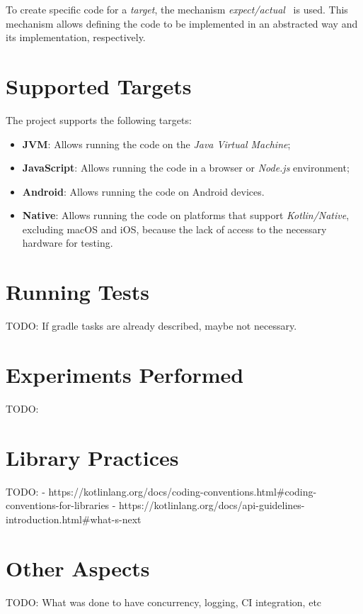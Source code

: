 To create specific code for a \textit{target}, the mechanism \textit{expect/actual}~\cite{kmp-expect-actual} is used.
This mechanism allows defining the code to be implemented in an abstracted way and its implementation, respectively.


\section{Supported Targets}\label{sec:supported-targets}

The project supports the following targets:

\begin{itemize}
    \item \textbf{JVM}: Allows running the code on the \textit{Java Virtual Machine};
    \item \textbf{JavaScript}: Allows running the code in a browser or \textit{Node.js} environment;
    \item \textbf{Android}: Allows running the code on Android devices.
    \item \textbf{Native}: Allows running the code on platforms that support \textit{Kotlin/Native}, excluding macOS and iOS, because the lack of access to the necessary hardware for testing.
\end{itemize}


\section{Running Tests}\label{sec:running-tests}
TODO: If gradle tasks are already described, maybe not necessary.


\section{Experiments Performed}\label{sec:experiments-performed}
TODO:

\section{Library Practices}\label{sec:library-practices}
TODO:
- https://kotlinlang.org/docs/coding-conventions.html#coding-conventions-for-libraries
- https://kotlinlang.org/docs/api-guidelines-introduction.html#what-s-next


\section{Other Aspects}\label{sec:other-aspects}
TODO: What was done to have concurrency, logging, CI integration, etc
